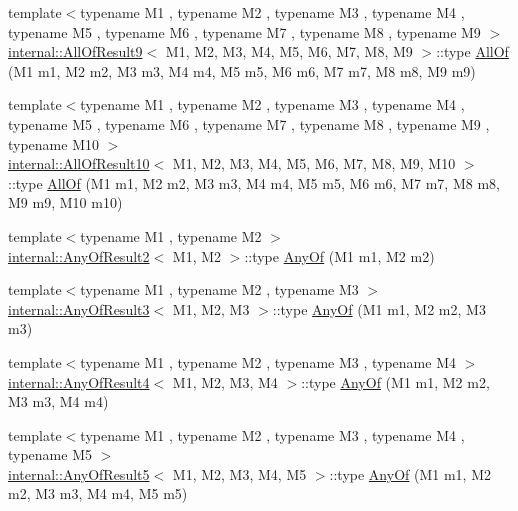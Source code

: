 \begin{DoxyCompactItemize}
\item 
{\footnotesize template$<$typename M1 , typename M2 , typename M3 , typename M4 , typename M5 , typename M6 , typename M7 , typename M8 , typename M9 $>$ }\\\hyperlink{structtesting_1_1internal_1_1AllOfResult9}{internal\+::\+All\+Of\+Result9}$<$ M1, M2, M3, M4, M5, M6, M7, M8, M9 $>$\+::type \hyperlink{namespacetesting_aaecf2bd8eb7c68b119f9b81a01942b7f}{All\+Of} (M1 m1, M2 m2, M3 m3, M4 m4, M5 m5, M6 m6, M7 m7, M8 m8, M9 m9)
\item 
{\footnotesize template$<$typename M1 , typename M2 , typename M3 , typename M4 , typename M5 , typename M6 , typename M7 , typename M8 , typename M9 , typename M10 $>$ }\\\hyperlink{structtesting_1_1internal_1_1AllOfResult10}{internal\+::\+All\+Of\+Result10}$<$ M1, M2, M3, M4, M5, M6, M7, M8, M9, M10 $>$\+::type \hyperlink{namespacetesting_a9939c08664efeed0c1983090115f7ecb}{All\+Of} (M1 m1, M2 m2, M3 m3, M4 m4, M5 m5, M6 m6, M7 m7, M8 m8, M9 m9, M10 m10)
\item 
{\footnotesize template$<$typename M1 , typename M2 $>$ }\\\hyperlink{structtesting_1_1internal_1_1AnyOfResult2}{internal\+::\+Any\+Of\+Result2}$<$ M1, M2 $>$\+::type \hyperlink{namespacetesting_a81cfefd9f75cdce827d5bc873cf73aac}{Any\+Of} (M1 m1, M2 m2)
\item 
{\footnotesize template$<$typename M1 , typename M2 , typename M3 $>$ }\\\hyperlink{structtesting_1_1internal_1_1AnyOfResult3}{internal\+::\+Any\+Of\+Result3}$<$ M1, M2, M3 $>$\+::type \hyperlink{namespacetesting_a3ccbde3ba01189587676d44a4333c0a5}{Any\+Of} (M1 m1, M2 m2, M3 m3)
\item 
{\footnotesize template$<$typename M1 , typename M2 , typename M3 , typename M4 $>$ }\\\hyperlink{structtesting_1_1internal_1_1AnyOfResult4}{internal\+::\+Any\+Of\+Result4}$<$ M1, M2, M3, M4 $>$\+::type \hyperlink{namespacetesting_a1cfcacf2cf19543b86445e3585d5356f}{Any\+Of} (M1 m1, M2 m2, M3 m3, M4 m4)
\item 
{\footnotesize template$<$typename M1 , typename M2 , typename M3 , typename M4 , typename M5 $>$ }\\\hyperlink{structtesting_1_1internal_1_1AnyOfResult5}{internal\+::\+Any\+Of\+Result5}$<$ M1, M2, M3, M4, M5 $>$\+::type \hyperlink{namespacetesting_a049ea436e52c242adc44b2b42dc03e50}{Any\+Of} (M1 m1, M2 m2, M3 m3, M4 m4, M5 m5)
\item 

\end{DoxyCompactItemize}
